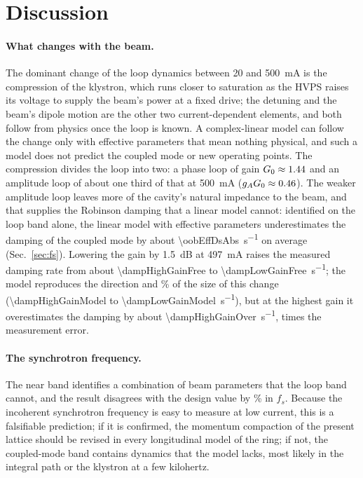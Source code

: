 \section{Discussion}\label{sec:disc}

\paragraph{What changes with the beam.} The dominant change of the loop dynamics between \SI{20}{} and \SI{500}{mA} is the compression of the klystron, which runs closer to saturation as the HVPS raises its voltage to supply the beam's power at a fixed drive; the detuning and the beam's dipole motion are the other two current-dependent elements, and both follow from physics once the loop is known. A complex-linear model can follow the change only with effective parameters that mean nothing physical, and such a model does not predict the coupled mode or new operating points. The compression divides the loop into two: a phase loop of gain $G_0\approx1.44$ and an amplitude loop of about one third of that at \SI{500}{mA} ($g_A G_0\approx0.46$). The weaker amplitude loop leaves more of the cavity's natural impedance to the beam, and that supplies the Robinson damping that a linear model cannot: identified on the loop band alone, the linear model with effective parameters underestimates the damping of the coupled mode by about \SI{\oobEffDsAbs}{s^{-1}} on average (Sec.~\ref{sec:fs}). Lowering the gain by \SI{1.5}{dB} at \SI{497}{mA} raises the measured damping rate from about \SI{\dampHighGainFree}{} to \SI{\dampLowGainFree}{s^{-1}}; the model reproduces the direction and \dampChangePct\% of the size of this change (\SI{\dampHighGainModel}{} to \SI{\dampLowGainModel}{s^{-1}}), but at the highest gain it overestimates the damping by about \SI{\dampHighGainOver}{s^{-1}}, \dampOverRatio{} times the measurement error.

\paragraph{The synchrotron frequency.} The near band identifies a combination of beam parameters that the loop band cannot, and the result disagrees with the design value by \fsRatio\% in $f_s$. Because the incoherent synchrotron frequency is easy to measure at low current, this is a falsifiable prediction; if it is confirmed, the momentum compaction of the present lattice should be revised in every longitudinal model of the ring; if not, the coupled-mode band contains dynamics that the model lacks, most likely in the integral path or the klystron at a few kilohertz.

